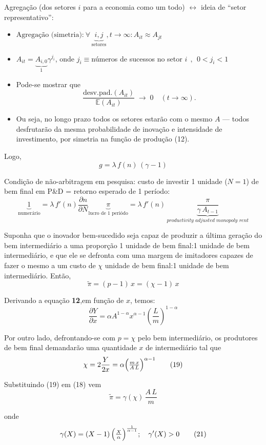 \documentclass[a4paper,12pt]{article}[abntex2]
\begin{document}
Agregação (dos setores \(i\) para a economia como um todo) \(\leftrightarrow\) ideia de “setor representativo”:  \begin{itemize}
    \item \(\text{Agregação (simetria):} \ \forall\,\underbrace{i,j}_\text{setores}, t\to\infty:A_{it}\approx A_{jt}\)
    \item \(A_{it}=\underbrace{A_{i,0}}_1\gamma^{j_i}\), onde \(j_i\equiv\)números de sucessos no setor \(i \ \ , \ \ 0<j_i<1\)
    \item Pode-se mostrar que  
    \[
      \frac{\mathrm{desv.pad.}(A_{it})}{\mathbb{E}(A_{it})} \;\longrightarrow\; 0
      \quad(t\to\infty).
    \]  
    \item Ou seja, no longo prazo todos os setores estarão com o mesmo \(A\) — todos desfrutarão da mesma probabilidade de inovação e intensidade de investimento, por simetria na função de produção (12).
\end{itemize}

Logo,  
\[
g = \lambda\,f(n)\,(\gamma - 1)
\tag{16$'$}
\]

Condição de não-arbitragem em pesquisa: custo de investir 1 unidade (\(N=1\)) de bem final em P\&D = retorno esperado de 1 período:  
\[
\underbrace{1}_\text{numerário} = \lambda\,f'(n) \frac{\partial n}{\partial N} \underbrace{\pi}_\text{lucro de 1 periódo}=\lambda\,f'(n)\,\underbrace{\frac{\pi}{\gamma\,A_{t-1}}}_\textit{productivity adjusted monopoly rent}  
\tag{17}
\]

Suponha que o inovador bem-sucedido seja capaz de produzir a última geração do bem intermediário a uma proporção 1 unidade de bem final:1 unidade de bem intermediário, e que ele se defronta com uma margem de imitadores capazes de fazer o mesmo a um custo de \(\chi\) unidade de bem final:1 unidade de bem intermediário. Então,  
\[
\tilde\pi = (p - 1)\,x = (\chi - 1)\,x
\tag{18}
\]

Derivando a equação \textbf{12},em função de \(x\), temos:
\[
\frac{\partial Y}{\partial x}=\alpha A^{1-\alpha}x^{\alpha-1}(\frac{L}{m})^{1-\alpha}
\]

Por outro lado, defrontando-se com \(p=\chi\) pelo bem intermediário, os produtores de bem final demandarão uma quantidade \(x\) de intermediário tal que  
\[
\chi = 2\frac{Y}{2x} = \alpha\Bigl(\tfrac{m\,x}{A\,L}\Bigr)^{\alpha-1}
\tag{19}
\]

Substituindo (19) em (18) vem  
\[
\tilde\pi = \gamma(\chi)\,\frac{A\,L}{m}
\tag{20}
\]

onde
\[
\gamma(X) = (X - 1)\,\Bigl(\tfrac{X}{\alpha}\Bigr)^{\frac{1}{\alpha - 1}};\quad \gamma'(X) > 0
\tag{21}
\]
\end{document}
